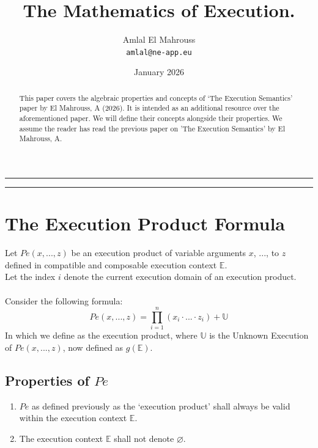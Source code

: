 \documentclass[11pt,a4paper]{article}
\title{The Mathematics of Execution.}
\author{Amlal El Mahrouss\\
\texttt{amlal@ne-app.eu}}
\date{January 2026}
\begin{document}
\bf \maketitle

\begin{center}
	\rule[0.01cm]{17cm}{0.01cm}
\end{center}

\begin{center}
\begin{abstract}
This paper covers the algebraic properties and concepts of `The Execution Semantics' paper by El Mahrouss, A (2026). It is intended as an additional resource over the aforementioned paper.
We will define their concepts alongside their properties. We assume the reader has read the previous paper on 'The Execution Semantics' by El Mahrouss, A.
\end{abstract}
\end{center}

\begin{center}
	\rule[1cm]{17cm}{0.01cm}
\end{center}

\section{The Execution Product Formula}

Let $Pe(x, ..., z)$ be an execution product of variable arguments $x$, $...$, to $z$ defined in compatible and composable execution context $\mathbb{E}$. \\
Let the index $i$ denote the current execution domain of an execution product.
\\ \\ Consider the following formula:
\begin{equation}
Pe(x, ..., z) = \prod_{i=1}^{n}(x_{i} \cdot ... \cdot z_{i})+\mathbb{U}
\end{equation}
In which we define as the execution product, where $\mathbb{U}$ is the Unknown Execution of $Pe(x, ..., z)$, now defined as $g(\mathbb{E})$.

\subsection{Properties of $Pe$}

\begin{enumerate}

    \item $Pe$ as defined previously as the `execution product' shall always be valid within the execution context $\mathbb{E}$.
    \item The execution context $\mathbb{E}$ shall not denote $\varnothing$.

\end{enumerate}
\end{document}
